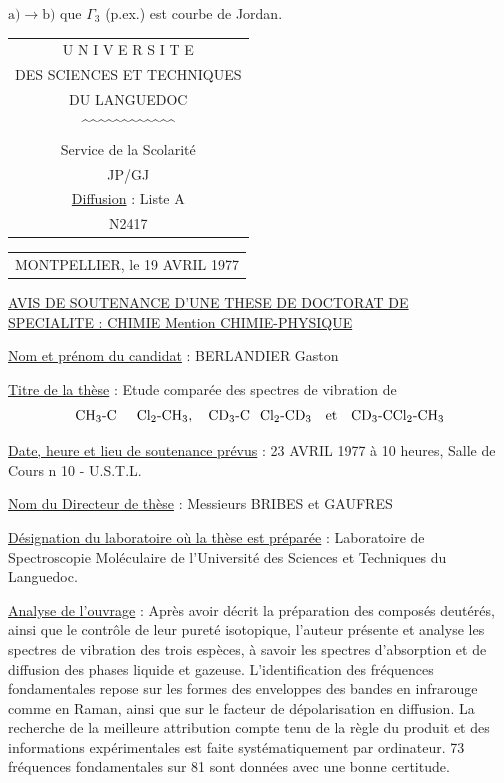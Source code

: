 $\mathrm{a)}\longrightarrow\mathrm{b)}$\qquad {} que $\Gamma_3$ (p.ex.) est courbe de Jordan.
\noindent\begin{tabular}[t]{@{}c@{}}
U N I V E R S I T E\\
DES SCIENCES ET TECHNIQUES\\
DU LANGUEDOC\\
\textasciicircum\textasciicircum\textasciicircum\textasciicircum\textasciicircum\textasciicircum\textasciicircum\textasciicircum\textasciicircum\textasciicircum\textasciicircum\textasciicircum\\[3pt]
Service de la Scolarité\\
JP/GJ\\[3pt]
\uline{Diffusion} : Liste A\\
N\textdegree{}2417
\end{tabular}\hfill\begin{tabular}[t]{@{}l@{}}
MONTPELLIER, le 19 AVRIL 1977\\
\end{tabular}

\begin{center}
\uline{AVIS DE SOUTENANCE D'UNE THESE DE DOCTORAT DE}\\[3pt]
\uline{SPECIALITE : CHIMIE Mention CHIMIE-PHYSIQUE}
\end{center}

\uline{Nom et prénom du candidat} : BERLANDIER Gaston

\uline{Titre de la thèse} : Etude comparée des spectres de vibration de
\[
\mathrm{CH}_{3}\text{-}\mathrm{C}\hphantom{\mathrm{CC}}\mathrm{Cl}_{2}\text{-}\mathrm{CH}_{3},\quad
\mathrm{CD}_{3}\text{-}\mathrm{C}\hphantom{\mathrm{C}}\mathrm{Cl}_{2}\text{-}\mathrm{CD}_{3}
\quad\text{et}\quad\mathrm{CD}_{3}\text{-}\mathrm{CCl}_{2}\text{-}\mathrm{CH}_{3}
\]

\uline{Date, heure et lieu de soutenance prévus} : 23 AVRIL 1977 à 10 heures, Salle de Cours n\textdegree{} 10 - U.S.T.L.

\uline{Nom du Directeur de thèse} : Messieurs BRIBES et GAUFRES

\uline{Désignation du laboratoire où la thèse est préparée} : Laboratoire de Spectroscopie Moléculaire de l'Université des Sciences et Techniques du Languedoc.

\uline{Analyse de l'ouvrage} : Après avoir décrit la préparation des composés deutérés, ainsi que le contrôle de leur pureté isotopique, l'auteur présente et analyse les spectres de vibration des trois espèces, à savoir les spectres d'absorption et de diffusion des phases liquide et gazeuse. L'identification des fréquences fondamentales repose sur les formes des enveloppes des bandes en infrarouge comme en Raman, ainsi que sur le facteur de dépolarisation en diffusion. La recherche de la meilleure attribution compte tenu de la règle du produit et des informations expérimentales est faite systématiquement par ordinateur. 73 fréquences fondamentales sur 81 sont données avec une bonne certitude.

